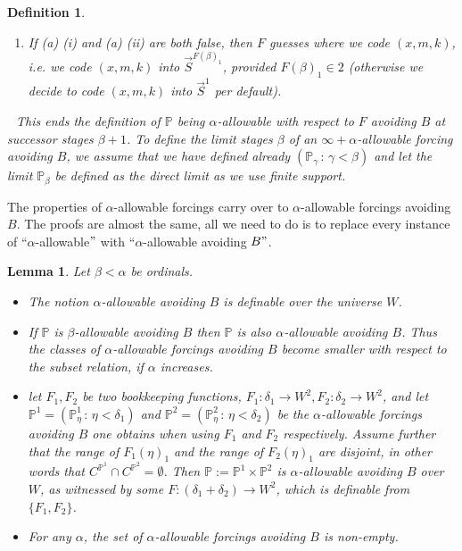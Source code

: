 \documentclass[a4paper,11pt]{article}
\newtheorem{lemma}[theorem]{Lemma}
\newtheorem{definition}[theorem]{Definition}
\newcommand{\forceP}{\mathbb{P}}
\begin{document}
\begin{definition}
\begin{enumerate}
    ﻿
    ﻿
    ﻿
    ﻿
    \item[(b)] If (a) (i) and (a) (ii) are both false, then $F$ guesses where we  code $(x,m,k)$, i.e. we code $(x,m,k)$ into $\vec{S}^{F(\beta)_1}$, provided  $F(\beta)_1 \in 2$ (otherwise we decide to code $(x,m,k)$ into $\vec{S}^1$ per default).
    ﻿
    ﻿
    ﻿
    ﻿
    \end{enumerate}
    ﻿
    ﻿
    This ends the definition of $\forceP$ being $\alpha$-allowable with respect to $F$ avoiding $B$ at successor stages $\beta+1$. To define the limit stages $\beta$ of an $\infty+ \alpha$-allowable forcing avoiding $B$, we assume that we have defined already $(\forceP_{\gamma} \, : \, \gamma < \beta)$ and let the limit $\forceP_{\beta}$ be defined as the direct limit as we use finite support. 
    ﻿
    \end{definition}

The properties of $\alpha$-allowable forcings carry over to $\alpha$-allowable forcings avoiding $B$. The proofs are almost the same, all we need to do is to replace every instance of ``$\alpha$-allowable$"$ with ``$\alpha$-allowable avoiding $B"$. 
      \begin{lemma}
Let $\beta < \alpha$ be ordinals. 
\begin{itemize}
\item The notion $\alpha$-allowable avoiding $B$ is definable over the universe $W$. 
\item    If $\forceP$ is $\beta$-allowable avoiding $B$ then $\forceP$ is also $\alpha$-allowable avoiding $B$. Thus the classes of $\alpha$-allowable forcings avoiding $B$ become smaller with respect to the subset relation, if $\alpha$ increases.
\item let $F_1, F_2$ be two bookkeeping functions, $F_1: \delta_1 \rightarrow W^2, F_2: \delta_2 \rightarrow W^2$, and let $\forceP^1=(\forceP^1_{\eta} \, : \, \eta < \delta_1)$ and $\forceP^2=(\forceP^2_{\eta} \, : \, \eta < \delta_2)$ be the $\alpha$-allowable forcings avoiding $B$ one obtains when using $F_1$ and $F_2$ respectively. Assume further that the range of $F_1 (\eta)_1$ and the range of $F_2(\eta)_1$ are disjoint, in other words that $C^{\forceP^1} \cap C^{\forceP^2} = \emptyset$.
    ﻿
    ﻿
    Then $\forceP:=\forceP^1 \times \forceP^2$ is $\alpha$-allowable avoiding $B$ over $W$, as witnessed by some $F: (\delta_1+\delta_2) \rightarrow W^2$, which is definable from $\{F_1,F_2\}$.
\item  For any $\alpha$, the set of $\alpha$-allowable forcings avoiding $B$ is non-empty.
    ﻿
    ﻿
\end{itemize}
    ﻿
    
    ﻿
    \end{lemma}
    
\end{document}

